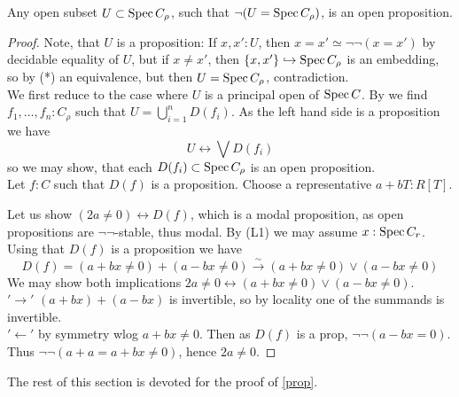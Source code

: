 \documentclass{article}
\begin{document}
\begin{lemma}{\label{lemma:heart}}
	Any open subset  $U \subset \operatorname{Spec} C_\rho$, such that $\lnot (U =\operatorname{Spec} C_\rho)$, is an open proposition.
\end{lemma}
\begin{proof}
	Note, that $U$ is a proposition: If $x,x' : U$, then $x = x' \simeq \lnot \lnot (x = x')$ by decidable equality of $U$, but if $x \neq x'$, then $\{x,x'\} \hookrightarrow \operatorname{Spec} C_\rho$ is an embedding, so by (*) an equivalence, but then $U = \operatorname{Spec} C_\rho$, contradiction. \\
	We first reduce to the case where $U$ is a principal open of $\operatorname{Spec} C$. By \cite{cherubini2023foundationsyntheticalgebraicgeometry} we find $f_1,\hdots,f_n : C_\rho$ such that $U = \bigcup_{i=1}^n D(f_i)$. As the left hand side is a proposition we have
	\[
	U \leftrightarrow \bigvee D(f_i)
	\]
	so we may show, that each $D(f_i) \subset \operatorname{Spec} C_\rho$ is an open proposition. \\
	Let $f : C$ such that $D(f)$ is a proposition. Choose a representative $a + bT : R[T]$.
	
	Let us show $(2a \neq 0) \leftrightarrow D(f)$, which is a modal proposition, as open propositions are $\lnot \lnot$-stable, thus modal. By (L1) we may assume $x : \operatorname{Spec} C_r$.
	Using that $D(f)$ is a proposition we have
	\[
	D(f) =  (a+bx \neq 0) + (a-bx \neq 0) \overset{\sim}{\to} (a+bx \neq 0) \lor (a-bx \neq 0)
	\]
	We may show both implications $2a \neq 0 \leftrightarrow (a+bx \neq 0) \lor (a-bx \neq 0) $. \\
	$'\rightarrow'$ $(a+bx) + (a-bx)$ is invertible, so by locality one of the summands is invertible. \\
	$'\leftarrow'$ by symmetry wlog $a + bx \neq 0$. Then as $D(f)$ is a prop, $\lnot \lnot (a - bx = 0)$. Thus $\lnot \lnot (a + a = a + bx \neq 0)$, hence $2 a \neq 0$. 	
\end{proof}
The rest of this section is devoted for the proof of \ref{prop}.
\end{document}
